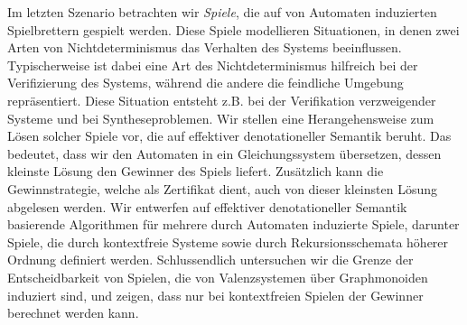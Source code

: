 \documentclass[../../diss.tex]{subfiles}
\begin{document}
{Im letzten Szenario betrachten wir \emph{Spiele}, die auf von Automaten induzierten Spielbrettern gespielt werden.
Diese Spiele modellieren Situationen, in denen zwei Arten von Nichtdeterminismus das Verhalten des Systems beeinflussen.
Typischerweise ist dabei eine Art des Nichtdeterminismus hilfreich bei der Verifizierung des Systems, während die andere die feindliche Umgebung repräsentiert.
Diese Situation entsteht z.B. bei der Verifikation verzweigender Systeme und bei Syntheseproblemen.
Wir stellen eine Herangehensweise zum Lösen solcher Spiele vor, die auf effektiver denotationeller Semantik beruht.
Das bedeutet, dass wir den Automaten in ein Gleichungssystem übersetzen, dessen kleinste Lösung den Gewinner des Spiels liefert.
Zusätzlich kann die Gewinnstrategie, welche als Zertifikat dient, auch von dieser kleinsten Lösung abgelesen werden.
Wir entwerfen auf effektiver denotationeller Semantik basierende Algorithmen für mehrere durch Automaten induzierte Spiele, darunter Spiele, die durch kontextfreie Systeme sowie durch Rekursionsschemata höherer Ordnung definiert werden.
Schlussendlich untersuchen wir die Grenze der Entscheidbarkeit von Spielen, die von Valenzsystemen über Graphmonoiden induziert sind, und zeigen, dass nur bei kontextfreien Spielen der Gewinner berechnet werden kann.
}%
\enlargethispage*{\baselineskip}%
\end{document}
